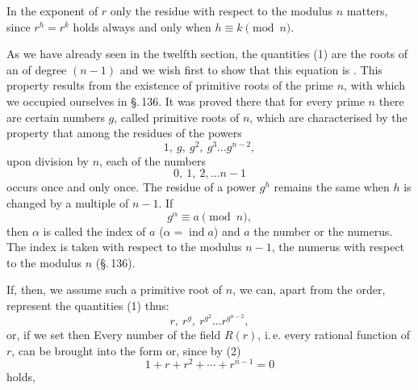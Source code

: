 In the exponent of $r$ only the residue with respect to the modulus $n$ matters, since $r^h = r^k$ holds always and only when $h \equiv k \pmod{n}$.

As we have already seen in the twelfth section, the quantities (1) are the roots of an  of degree $(n-1)$
and we wish first to show that this equation is . This property results from the existence of primitive roots of the prime $n$, with which we occupied ourselves in \S.\,136. It was proved there that for every prime $n$ there are certain numbers $g$, called primitive roots of $n$, which are characterised by the property that among the residues of the powers
\[
1, \ g, \ g^2, \ g^3 \dots g^{n-2},
\]
upon division by $n$, each of the numbers
\[
0, \ 1, \ 2, \dots n-1
\]
occurs once and only once. The residue of a power $g^h$ remains the same when $h$ is changed by a multiple of $n-1$. If
\[
g^\alpha \equiv a \pmod{n},
\]
then $\alpha$ is called the index of $a$ ($\alpha = \operatorname{ind} a$) and $a$ the number or the numerus. The index is taken with respect to the modulus $n-1$, the numerus with respect to the modulus $n$ (\S.\,136).

If, then, we assume such a primitive root of $n$, we can, apart from the order, represent the quantities (1) thus:
\[
r, \ r^g, \ r^{g^2} \dots r^{g^{n-2}},
\]
or, if we set
then
Every number of the field $R(r)$, i.\,e. every rational function of $r$, can be brought into the form
or, since by (2)
\[
1 + r + r^2 + \cdots + r^{n-1} = 0
\]
holds,
